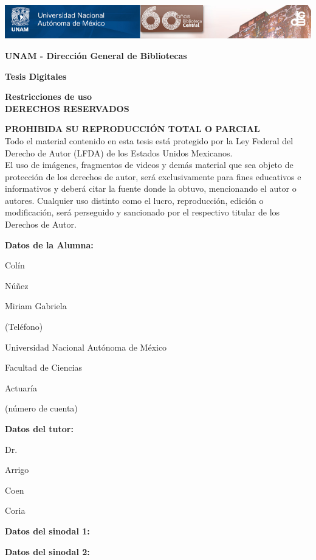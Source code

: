 \includegraphics[width = \textwidth]{DGB.png}

\textbf{UNAM - Dirección General de Bibliotecas}

\textbf{Tesis Digitales}
 
\textbf{Restricciones de uso}\\

\textbf{DERECHOS RESERVADOS \textcopyright}

\textbf{PROHIBIDA SU REPRODUCCIÓN TOTAL O PARCIAL}\\

Todo el material contenido en esta tesis está protegido por la Ley Federal del Derecho de Autor (LFDA) de los Estados Unidos Mexicanos.\\

El uso de imágenes, fragmentos de videos y demás material que sea objeto de protección de los derechos de autor, será exclusivamente para fines educativos e informativos y deberá citar la fuente donde la obtuvo, mencionando el autor o autores. Cualquier uso distinto como el lucro, reproducción, edición o modificación, será perseguido y sancionado por el respectivo titular de los Derechos de Autor.

\newpage %
\thispagestyle{empty} %

\textbf{Datos de la Alumna:}

Colín

Núñez

Miriam Gabriela

(Teléfono)

Universidad Nacional Autónoma de México

Facultad de Ciencias

Actuaría

(número de cuenta)


\textbf{Datos del tutor:}

Dr.

Arrigo

Coen

Coria


\textbf{Datos del sinodal 1:}




\textbf{Datos del sinodal 2:}




